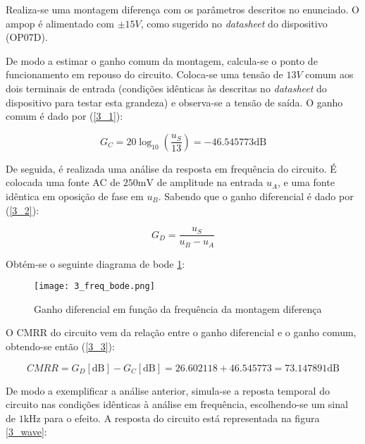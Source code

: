 \documentclass[a4paper, 2pt]{report}
\begin{document}
\par Realiza-se uma montagem diferença com os parâmetros descritos no enunciado. O ampop é alimentado com \(\pm 15V\), como sugerido no \textit{datasheet} do dispositivo (OP07D).

\par De modo a estimar o ganho comum da montagem, calcula-se o ponto de funcionamento em repouso do circuito. Coloca-se uma tensão de \(13V\) comum aos dois terminais de entrada (condições idênticas às descritas no \textit{datasheet} do dispositivo para testar esta grandeza) e observa-se a tensão de saída. O ganho comum é dado por (\ref{3_1}):

\begin{equation}
    G_C = 20 \log_{10}(\frac{u_S}{13}) = -46.545773\text{dB}
    \label{3_1}
\end{equation}

\par De seguida, é realizada uma análise da resposta em frequência do circuito. É colocada uma fonte AC de \(250\text{mV}\) de amplitude na entrada \(u_A\), e uma fonte idêntica em oposição de fase em \(u_B\). Sabendo que o ganho diferencial é dado por (\ref{3_2}):

\begin{equation}
    G_D = \frac{u_S}{u_B - u_A}
    \label{3_2}
\end{equation}

\par Obtém-se o seguinte diagrama de bode \ref{3_bode}:

\begin{figure}[H]
    \centering
    \texttt{[image: 3\_freq\_bode.png]}
    \caption{Ganho diferencial em função da frequência da montagem diferença}
    \label{3_bode}
\end{figure}

\par O CMRR do circuito vem da relação entre o ganho diferencial e o ganho comum, obtendo-se então (\ref{3_3}):

\begin{equation}
    \textit{CMRR} = G_D[\text{dB}] - G_C[\text{dB}] = 26.602118 + 46.545773 = 73.147891 \text{dB}
    \label{3_3}
\end{equation}

\par De modo a exemplificar a análise anterior, simula-se a reposta temporal do circuito nas condições idênticas à análise em frequência, escolhendo-se um sinal de \(1 \text{kHz}\) para o efeito. A resposta do circuito está representada na figura \ref{3_wave}:
\end{document}
